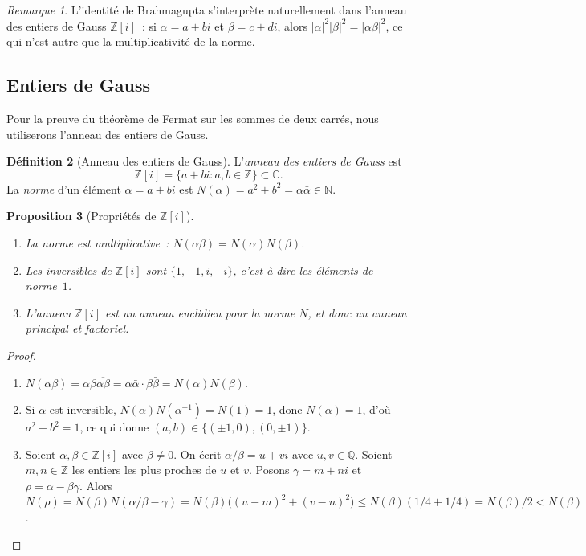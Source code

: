 \documentclass[12pt,a4paper,openany]{book}
\theoremstyle{definition}
\newtheorem{definition}{Définition}[chapter]
\theoremstyle{plain}
\newtheorem{proposition}[definition]{Proposition}
\theoremstyle{remark}
\newtheorem{remarque}[definition]{Remarque}
\newcommand{\N}{\mathbb{N}}
\newcommand{\Z}{\mathbb{Z}}
\newcommand{\Q}{\mathbb{Q}}
\newcommand{\C}{\mathbb{C}}
\newcommand{\abs}[1]{\left|#1\right|}
\begin{document}
\begin{remarque}
\label{rem:brahmagupta-gaussiens}
L'identité de Brahmagupta s'interprète naturellement dans l'anneau des entiers de
Gauss $\Z[i]$~: si $\alpha = a + bi$ et $\beta = c + di$, alors
$\abs{\alpha}^2 \abs{\beta}^2 = \abs{\alpha\beta}^2$, ce qui n'est autre que la
multiplicativité de la norme.
\end{remarque}

\subsection{Entiers de Gauss}

Pour la preuve du théorème de Fermat sur les sommes de deux carrés, nous utiliserons
l'anneau des entiers de Gauss.

\begin{definition}[Anneau des entiers de Gauss]
\label{def:entiers-gauss}
L'\emph{anneau des entiers de Gauss} est
\[
  \Z[i] = \{a + bi : a, b \in \Z\} \subset \C.
\]
La \emph{norme}\index{norme!dans $\Z[i]$} d'un élément $\alpha = a + bi$ est
$N(\alpha) = a^2 + b^2 = \alpha \bar{\alpha} \in \N$.
\end{definition}

\begin{proposition}[{Propriétés de $\Z[i]$}]
\label{prop:proprietes-Z-i}
\begin{enumerate}[label=(\roman*)]
  \item La norme est multiplicative~: $N(\alpha\beta) = N(\alpha)N(\beta)$.
  \item Les inversibles de $\Z[i]$ sont $\{1, -1, i, -i\}$, c'est-à-dire les éléments de
    norme~$1$.
  \item L'anneau $\Z[i]$ est un anneau euclidien pour la norme $N$, et donc un anneau
    principal et factoriel.
\end{enumerate}
\end{proposition}

\begin{proof}
\begin{enumerate}[label=(\roman*)]
  \item $N(\alpha\beta) = \alpha\beta\overline{\alpha\beta}
    = \alpha\bar\alpha\cdot\beta\bar\beta = N(\alpha)N(\beta)$.
  \item Si $\alpha$ est inversible, $N(\alpha)N(\alpha^{-1}) = N(1) = 1$, donc
    $N(\alpha) = 1$, d'où $a^2 + b^2 = 1$, ce qui donne $(a,b) \in \{(\pm 1, 0),
    (0, \pm 1)\}$.
  \item Soient $\alpha, \beta \in \Z[i]$ avec $\beta \neq 0$. On écrit
    $\alpha/\beta = u + vi$ avec $u, v \in \Q$. Soient $m, n \in \Z$ les entiers les plus
    proches de $u$ et $v$. Posons $\gamma = m + ni$ et $\rho = \alpha - \beta\gamma$.
    Alors $N(\rho) = N(\beta)N(\alpha/\beta - \gamma) = N(\beta)\bigl((u-m)^2 +
    (v-n)^2\bigr) \leq N(\beta)(1/4 + 1/4) = N(\beta)/2 < N(\beta)$. \qedhere
\end{enumerate}
\end{proof}
\end{document}
